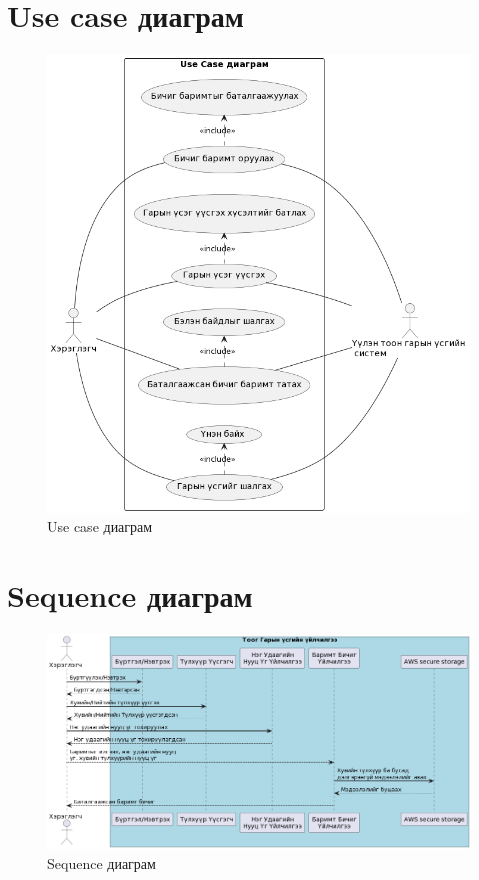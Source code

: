 \section{Use case диаграм}
\begin{figure}[h]
	\centering
	\includegraphics[scale=0.56]{assets/usecase_mn.png}
	\caption{Use case диаграм}
	\label{fig:usecasemn}
\end{figure}
\newpage
\section{Sequence диаграм}
\begin{figure}[h!]
	\centering
	\includegraphics[scale=0.55, angle=90]{assets/sequence2.png}
	\caption{Sequence диаграм}
	\label{fig:usecasemn}
\end{figure}
\newpage
\break

